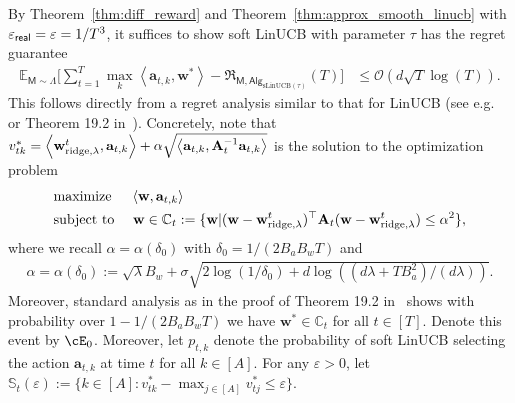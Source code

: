\documentclass[10pt]{article}
\renewcommand{\epsilon}{\varepsilon}
\newcommand{\eps}{\varepsilon}
\renewcommand{\cO}{\mathcal{O}}
\newcommand{\<}{\left\langle}
\renewcommand{\>}{\right\rangle}
\newcommand{\ridge}{{\rm ridge}}
\newcommand{\E}{\mathbb{E}}
\newcommand{\inst}{{\mathsf{M}}}
\newcommand{\sLinUCB}{{\mathrm{sLinUCB}}}
\newcommand{\temp}{{\tau}}
\newcommand{\cwid}{{\alpha}}
\newcommand{\totlen}{{T}}
\newcommand{\sAlg}{{\mathsf{Alg}}}
\newcommand{\prior}{{\Lambda}}
\newcommand{\geneps}{{\epsilon}_{\sf real}}
\newcommand{\totreward}{{\mathfrak{R}}}
\def\sC{{\mathbb{C}}}
\def\sS{{\mathbb{S}}}
\def\bA{{\mathbf A}}
\def\ba{{\mathbf a}}
\def\bw{{\mathbf w}}
\begin{document}
By Theorem~\ref{thm:diff_reward} and Theorem~\ref{thm:approx_smooth_linucb} with ${\geneps=\eps=1/\totlen^3}$, it suffices to show soft LinUCB with parameter $\temp$ has the regret guarantee \begin{align*}
\E_{\inst\sim\prior}\Big[\sum_{t=1}^\totlen\max_{k}\<\ba_{t,k},\bw^*\>-\totreward_{\inst,\sAlg_{\sLinUCB(\temp)}}(\totlen)\Big]&\leq\cO(d\sqrt{T}\log(T)).
\end{align*}
This follows directly from a  regret analysis similar to  that for LinUCB (see e.g.~\cite{chu2011contextual} or  Theorem 19.2 in~\cite{lattimore2020bandit}). Concretely, note that $v_{tk}^*=\<\bw^t_{\ridge,\lambda},\ba_{t,k}\>+\alpha\sqrt{\<\ba_{t,k}, {\bA_t^{-1} \ba_{t,k}}\>}$ is the solution to the optimization problem
\begin{align*}&\text{maximize }~~~\<\bw,\ba_{t,k}\>
\\
&\text{subject to }~~~\bw\in \sC_t:=\{\bw|(\bw-\bw^t_{\ridge,\lambda})^\top\bA_t(\bw-\bw^t_{\ridge,\lambda})\leq\alpha^2\},
\end{align*}
where we recall $\alpha=\alpha(\delta_0)$ with $\delta_0=1/(2B_aB_wT)$ and
\begin{align}
\cwid=\cwid(\delta_0):=\sqrt{\lambda}B_w+\sigma\sqrt{2\log(1/\delta_0)+d\log((d\lambda+TB_a^2)/(d\lambda))}.\label{eq:recall_alpha_formula}
\end{align}
Moreover, standard analysis as in the proof of Theorem 19.2 in~\cite{lattimore2020bandit} shows with probability over $1-1/(2B_aB_wT)$ we have $\bw^*\in\sC_t$ for all $t\in[T]$. Denote this event by $\cE_0$. Moreover, let $p_{t,k}$ denote the probability of soft LinUCB selecting the action $\ba_{t,k}$ at time $t$ for all $k\in[A]$.  For any $\eps>0$, let $\sS_t(\eps):=\{k\in[A]:v^*_{tk}-\max_{j\in[A]}v^*_{tj}\leq \eps\}$.
\end{document}
